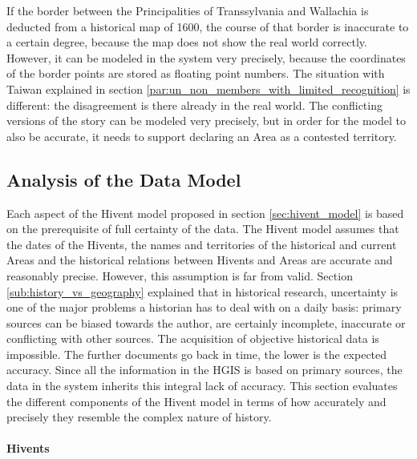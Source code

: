 If the border between the Principalities of Transsylvania and Wallachia is deducted from a historical map of 1600, the course of that border is inaccurate to a certain degree, because the map does not show the real world correctly. However, it can be modeled in the system very precisely, because the coordinates of the border points are stored as floating point numbers.
The situation with Taiwan explained in section \ref{par:un_non_members_with_limited_recognition} is different: the disagreement is there already in the real world. The conflicting versions of the story can be modeled very precisely, but in order for the model to also be accurate, it needs to support declaring an Area as a contested territory.

\subsection{Analysis of the Data Model} %
\label{sub:data_model}

Each aspect of the Hivent model proposed in section \ref{sec:hivent_model} is based on the prerequisite of full certainty of the data. The Hivent model assumes that the dates of the Hivents, the names and territories of the historical and current Areas and the historical relations between Hivents and Areas are accurate and reasonably precise. However, this assumption is far from valid. Section \ref{sub:history_vs_geography} explained that in historical research, uncertainty is one of the major problems a historian has to deal with on a daily basis: primary sources can be biased towards the author, are certainly incomplete, inaccurate or conflicting with other sources. The acquisition of objective historical data is impossible. The further documents go back in time, the lower is the expected accuracy. Since all the information in the HGIS is based on primary sources, the data in the system inherits this integral lack of accuracy. This section evaluates the different components of the Hivent model in terms of how accurately and precisely they resemble the complex nature of history.

\paragraph{Hivents} %
\label{par:evaluation_hivents}

